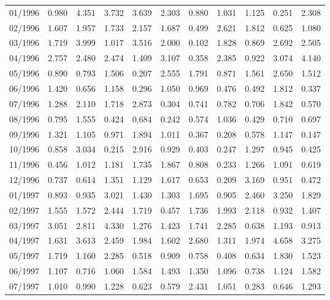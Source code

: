 \begin{tabular}{lrrrrrrrrrr}
01/1996 &  0.980 &  4.351 &  3.732 &  3.639 &  2.303 &  0.880 &  1.031 &  1.125 &  0.251 &  2.308 \\
02/1996 &  1.607 &  1.957 &  1.733 &  2.157 &  1.687 &  0.499 &  2.621 &  1.812 &  0.625 &  1.080 \\
03/1996 &  1.719 &  3.999 &  1.017 &  3.516 &  2.000 &  0.102 &  1.828 &  0.869 &  2.692 &  2.505 \\
04/1996 &  2.757 &  2.480 &  2.474 &  1.409 &  3.107 &  0.358 &  2.385 &  0.922 &  3.074 &  4.140 \\
05/1996 &  0.890 &  0.793 &  1.506 &  0.207 &  2.555 &  1.791 &  0.871 &  1.561 &  2.650 &  1.512 \\
06/1996 &  1.420 &  0.656 &  1.158 &  0.296 &  1.050 &  0.969 &  0.476 &  0.492 &  1.812 &  0.337 \\
07/1996 &  1.288 &  2.110 &  1.718 &  2.873 &  0.304 &  0.741 &  0.782 &  0.706 &  1.842 &  0.570 \\
08/1996 &  0.795 &  1.555 &  0.424 &  0.684 &  0.242 &  0.574 &  1.036 &  0.429 &  0.710 &  0.697 \\
09/1996 &  1.321 &  1.105 &  0.971 &  1.894 &  1.011 &  0.367 &  0.208 &  0.578 &  1.147 &  0.147 \\
10/1996 &  0.858 &  3.034 &  0.215 &  2.916 &  0.929 &  0.403 &  0.247 &  1.297 &  0.945 &  0.425 \\
11/1996 &  0.456 &  1.012 &  1.181 &  1.735 &  1.867 &  0.808 &  0.233 &  1.266 &  1.091 &  0.619 \\
12/1996 &  0.737 &  0.614 &  1.351 &  1.129 &  1.617 &  0.653 &  0.209 &  3.169 &  0.951 &  0.472 \\
01/1997 &  0.893 &  0.935 &  3.021 &  1.430 &  1.303 &  1.695 &  0.905 &  2.460 &  3.250 &  1.829 \\
02/1997 &  1.555 &  1.572 &  2.444 &  1.719 &  0.457 &  1.736 &  1.993 &  2.118 &  0.932 &  1.407 \\
03/1997 &  3.051 &  2.811 &  4.330 &  1.276 &  1.423 &  1.741 &  2.285 &  0.638 &  1.193 &  0.913 \\
04/1997 &  1.631 &  3.613 &  2.459 &  1.984 &  1.602 &  2.680 &  1.311 &  1.974 &  4.658 &  3.275 \\
05/1997 &  1.719 &  1.160 &  2.285 &  0.518 &  0.909 &  0.758 &  0.408 &  0.634 &  1.830 &  1.523 \\
06/1997 &  1.107 &  0.716 &  1.060 &  1.584 &  1.493 &  1.350 &  1.096 &  0.738 &  1.124 &  1.582 \\
07/1997 &  1.010 &  0.990 &  1.228 &  0.623 &  0.579 &  2.431 &  1.051 &  0.283 &  0.646 &  1.293 \\

\end{tabular}
